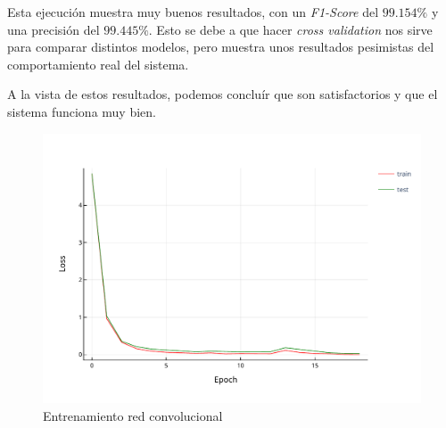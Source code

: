 \documentclass[12pt]{article}
\begin{document}
\bigskip
Esta ejecución muestra muy buenos resultados, con un \textit{F1-Score} del $99.154\%$ y una precisión
del $99.445\%$. Esto se debe a que hacer \textit{cross validation} nos sirve para comparar distintos modelos, 
pero muestra unos resultados pesimistas del comportamiento real del sistema.

\bigskip 
A la vista de estos resultados, podemos concluír que son satisfactorios y que el sistema funciona
muy bien.

\begin{figure}[H]
	\centering
	\includegraphics[width=1.0\linewidth]{assets/best_conv_train.pdf}
	\caption{Entrenamiento red convolucional}
	\label{fig:best_conv_6}
\end{figure}
\end{document}
